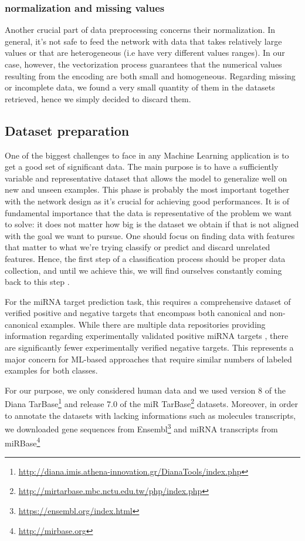 \subsubsection{normalization and missing values}
Another crucial part of data preprocessing concerns their normalization. In general, it's not safe to feed the network with data that takes relatively large values or that are heterogeneous (i.e have very different values ranges). In our case, however, the vectorization process guarantees that the numerical values resulting from the encoding are both small and homogeneous. Regarding missing or incomplete data, we found a very small quantity of them in the datasets retrieved, hence we simply decided to discard them.  

\subsection{Dataset preparation}
One of the biggest challenges to face in any Machine Learning application is to get a good set of significant data.
The main purpose is to have a sufficiently variable and representative dataset that allows the model to generalize well on new and unseen examples. This phase is probably the most important together with the network design as it's crucial for achieving good performances. It is of fundamental importance that the data is representative of the problem we want to solve: it does not matter how big is the dataset we obtain if that is not aligned with the goal we want to pursue. One should focus on finding data with features that matter to what we’re trying classify or predict and discard unrelated features. Hence, the first step of a classification process should be proper data collection, and until we achieve this, we will find ourselves constantly coming back to this step \cite{imbalanced_datasets}.

For the miRNA target prediction task, this requires a comprehensive dataset of verified positive and negative targets that encompass both canonical and non-canonical examples. While there are multiple data repositories providing information regarding experimentally validated positive miRNA targets\cite{dianatarbase} \cite{mirtarbase}, there are significantly fewer experimentally verified negative targets. This represents a major concern for ML-based approaches that require similar numbers of labeled examples for both classes.

For our purpose, we only considered human data and we used version 8 of the Diana TarBase\footnote{\url{http://diana.imis.athena-innovation.gr/DianaTools/index.php}} and release 7.0 of the miR TarBase\footnote{\url{http://mirtarbase.mbc.nctu.edu.tw/php/index.php}} datasets. Moreover, in order to annotate the datasets with lacking informations such as molecules transcripts, we downloaded gene sequences from Ensembl\footnote{\url{https://ensembl.org/index.html}} and miRNA transcripts from miRBase\footnote{\url{http://mirbase.org}} 

